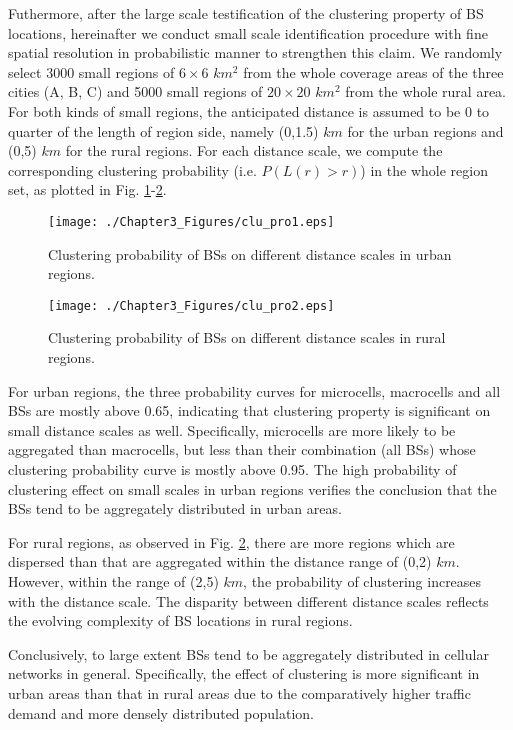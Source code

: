 Futhermore, after the large scale testification of the clustering property of BS locations, hereinafter we conduct small scale identification procedure with fine spatial resolution in probabilistic manner to strengthen this claim. We randomly select 3000 small regions of $6\times6$ $km^2$ from the whole coverage areas of the three cities (A, B, C) and 5000 small regions of $20\times20$ $km^2$ from the whole rural area. For both kinds of small regions, the anticipated  distance is assumed to be 0 to quarter of the length of region side, namely (0,1.5) $km$ for the urban regions and (0,5) $km$ for the rural regions. For each distance scale, we compute the corresponding clustering probability (i.e. $P(L(r)>r)$) in the whole region set, as plotted in Fig. \ref{clu_pro1}-\ref{clu_pro2}.

\begin{figure}[!htb]
\centering
\texttt{[image: ./Chapter3\_Figures/clu\_pro1.eps]}
\centering
\caption{Clustering probability of BSs on different distance scales in urban regions.}
\label{clu_pro1}
\end{figure}

\begin{figure}[!htb]
\centering
\texttt{[image: ./Chapter3\_Figures/clu\_pro2.eps]}
\centering
\caption{Clustering probability of BSs on different distance scales in rural regions.}
\label{clu_pro2}
\end{figure}

For urban regions, the three probability curves for microcells, macrocells and all BSs are mostly above 0.65, indicating that clustering property is significant on small distance scales as well. Specifically, microcells are more likely to be aggregated than macrocells, but less than their combination (all BSs) whose clustering probability curve is mostly above 0.95. The high probability of clustering effect on small scales in urban regions verifies the conclusion that the BSs tend to be aggregately distributed in urban areas.

For rural regions, as observed in Fig. \ref{clu_pro2}, there are more regions which are dispersed than that are aggregated within the distance range of (0,2) $km$. However, within the range of (2,5) $km$, the probability of clustering increases with the distance scale. The disparity between different distance scales reflects the evolving complexity of BS locations in rural regions.

\begin{remark}
Conclusively, to large extent BSs tend to be aggregately distributed in cellular networks in general. Specifically, the effect of clustering is more significant in urban areas than that in rural areas due to the comparatively higher traffic demand and more densely distributed population.
\end{remark}
